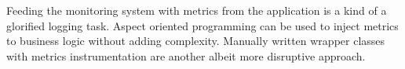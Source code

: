 \documentclass[english]{tktltiki2}
\theoremstyle{definition}
\theoremstyle{remark}
\begin{document}
Feeding the monitoring system with metrics from the application is a kind of a
glorified logging task. Aspect oriented programming can be used to inject
metrics to business logic without adding complexity. Manually written wrapper
classes with metrics instrumentation are another albeit more disruptive
approach.







\end{document}
